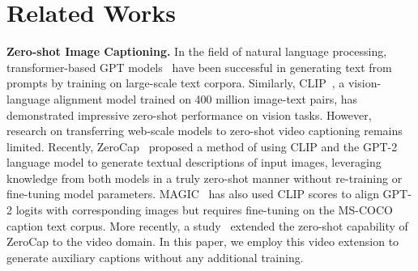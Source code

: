\documentclass[10pt,twocolumn,letterpaper]{article}
\begin{document}
 \section{Related Works}
\noindent\textbf{Zero-shot Image Captioning.}
In the field of natural language processing, transformer-based GPT models~\cite{GPT,GPT3} have been successful in generating text from prompts by training on large-scale text corpora. Similarly, CLIP~\cite{clip}, a vision-language alignment model trained on 400 million image-text pairs, has demonstrated impressive zero-shot performance on vision tasks. However, research on transferring web-scale models to zero-shot video captioning remains limited.
Recently, ZeroCap~\cite{tewel2022zerocap} proposed a method of using CLIP and the GPT-2 language model to generate textual descriptions of input images, leveraging knowledge from both models in a truly zero-shot manner without re-training or fine-tuning model parameters. MAGIC~\cite{su2022magic} has also used CLIP scores to align GPT-2 logits with corresponding images but requires fine-tuning on the MS-COCO caption text corpus.
More recently, a study~\cite{videocap} extended the zero-shot capability of ZeroCap to the video domain. In this paper, we employ this video extension to generate auxiliary captions without any additional training.
\end{document}
